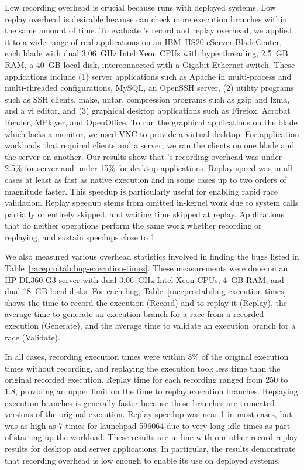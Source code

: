 Low recording overhead is crucial
because \racepro runs with deployed systems.  Low replay overhead is desirable
because \racepro can check more execution branches within the same amount of
time.  To evaluate \racepro's record and replay overhead, we
applied it to a wide range of real applications on an IBM~HS20 eServer
BladeCenter, each blade with dual 3.06~GHz Intel Xeon CPUs with
hyperthreading, 2.5~GB RAM, a 40~GB local disk, interconnected with a
Gigabit Ethernet switch.  
These applications include (1) server applications such as Apache
in multi-process and multi-threaded configurations, MySQL, an
OpenSSH server, (2) utility programs such as SSH clients, make, untar,
compression programs such as gzip and lzma, and a vi editor, and (3)
graphical desktop applications such as Firefox, Acrobat Reader,
MPlayer, and OpenOffice.  To run the graphical applications on the
blade which lacks a monitor, we used VNC to provide a virtual desktop. 
For application workloads that required clients
and a server, we ran the clients on one blade and the server on another.
Our results show
that \racepro's recording overhead was under 2.5\% for server and under 15\% for
desktop applications.  Replay speed was in all cases at least as fast as
native execution and in some cases up to two orders of magnitude faster.
This speedup is particularly useful for enabling rapid race validation.
Replay speedup stems from omitted in-kernel work due to system calls
partially or entirely skipped, and waiting time skipped at replay.
Applications that do neither operations perform the same work
whether recording or replaying, and sustain speedups close to 1.

We also measured various overhead statistics involved in finding the
bugs listed in Table~\ref{racepro:tab:bug-execution-times}.  These measurements were done
on an HP DL360 G3 server with dual 3.06~GHz Intel Xeon CPUs, 4~GB RAM,
and dual 18~GB local disks.  For
each bug, Table~\ref{racepro:tab:bug-execution-times} shows the time to record the
execution (Record) and to 
replay it (Replay), the average time to generate an execution branch
for a race from a recorded execution (Generate), and the average time
to validate an execution branch for a race (Validate).

In all cases, recording execution times were within 3\% of the original
execution times without recording, and replaying the execution
took less time than the original recorded execution.  Replay time for
each recording ranged from 250\ms{} to 1.8\secs{}, providing an upper
limit on the time to replay execution branches.  Replaying execution
branches is generally faster because those branches are truncated
versions of the original execution.  Replay speedup was near 1 in most
cases, but was as high as 7 times for launchpad-596064 due to very
long idle times as part of starting up the workload.
These results are in line with our other record-replay results for
desktop and server applications.  In particular, the results
demonstrate that \racepro recording overhead is low enough to enable its
use on deployed systems. 

